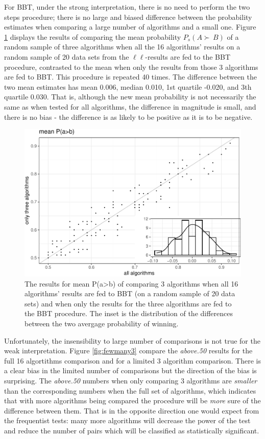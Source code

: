 \documentclass[twoside,11pt,preprint]{article}
\begin{document}
For BBT, under the strong interpretation, there is no need to perform the two steps procedure; there is no large and biased difference
between the probability estimates when comparing a large number of algorithms and a small one. Figure \ref{fig:fewmany2}
displays the results of comparing the mean probability \(P_s(A \succ\,B)\) of a random sample of three
algorithms when all the 16 algorithms' results on a random sample of 20 data sets from the $\ell\ell$-results are fed to the BBT procedure, contrasted to the mean when only the results from those 3 algorithms are fed to BBT. This procedure is repeated 40 times. The difference between the two mean estimates has mean 0.006, median 0.010, 1st quartile -0.020, and 3th quartile 0.030. That is, although the new mean probability is not necessarily the same as when tested for all algorithms, the difference in magnitude is small, and there is no bias - the difference is as likely to be positive as it is to be negative.

\begin{figure}
\includegraphics[width=0.7\linewidth]{figure-latex/fewmany2-1} \caption{\label{fig:fewmany2}The results for mean P(a>b) of comparing 3 algorithms when all 16 algorithms' results are fed to BBT (on a random sample of 20 data sets) and when only the results for the three algorithms are fed to the BBT procedure. The inset is the distribution of the differences between the two avergage probability of winning.}\label{fig:fewmany2}
\end{figure}

Unfortunately, the insensibility to large number of comparisons is not true for the weak interpretation. Figure \ref{fig:fewmany3} compare the {\em above.50} results for the full 16 algortithms comparison and for a limited 3 algorithm comparison. There is a clear bias in the limited number of comparisons but the direction of the bias is surprising. The {\em above.50} numbers when only comparing 3 algorithms are \emph{smaller} than the corresponding numbers when the full set of algorithms, which indicates that with more algorithms being compared the procedure will be \emph{more} sure of the difference between them. That is in the opposite direction one would expect from the frequentist tests: many more algorithms will decrease the power of the test and reduce the number of pairs which will be classified as statistically significant.
\end{document}
